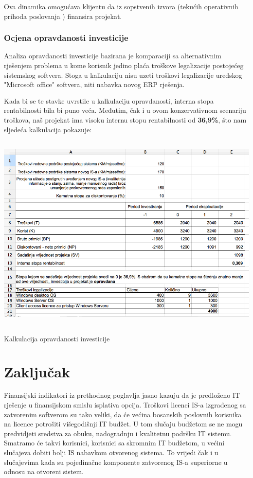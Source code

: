 \documentclass[times, utf8, seminar]{fit}
\begin{document}
Ova dinamika omogućava klijentu da iz sopstvenih izvora (tekućih operativnih prihoda poslovanja \citep{prasorep}) finansira projekat.

\subsection{Ocjena opravdanosti investicije}

Analiza opravdanosti investicije bazirana je komparaciji sa alternativnim rješenjem problema u kome korisnik jedino plaća troškove legalizacije postojećeg sistemskog softvera.
Stoga u kalkulaciju nisu uzeti troškovi legalizacije uredskog "Microsoft office" softvera, niti nabavka novog ERP rješenja.

Kada bi se te stavke uvrstile u kalkulaciju opravdanosti, interna stopa rentabilnosti bila bi puno veća. Međutim, čak i u ovom konzervativnom scenariju troškova, naš projekat ima visoku internu stopu rentabilnosti od \textbf{36,9\%}, što nam sljedeća kalkulacija pokazuje:

\begin{table}[!h]
\centering
\includegraphics[height=10cm]{img/kalk_opravdanost.png}
\caption{Kalkulacija opravdanosti investicije}
\end{table}

\chapter{Zaključak}

Finansijski indikatori iz prethodnog poglavlja jasno kazuju da je predloženo IT rješenje u finansijskom smislu isplativa opcija. Troškovi licenci IS-a izgrađenog sa zatvorenim softverom  su tako veliki, da će većina bosanskih poslovnih korisnika na licence potrošiti višegodišnji IT budžet. U tom slučaju budžetom se ne mogu predvidjeti sredstva za obuku, nadogradnju i kvalitetnu podršku IT sistemu. Smatramo će takvi korisnici, korisnici sa skromnim IT budžetom, u većini slučajeva dobiti bolji IS nabavkom otvorenog sistema. To vrijedi čak i u slučajevima kada su pojedinačne komponente zatvorenog IS-a superiorne u odnosu na otvoreni sistem.
\end{document}
